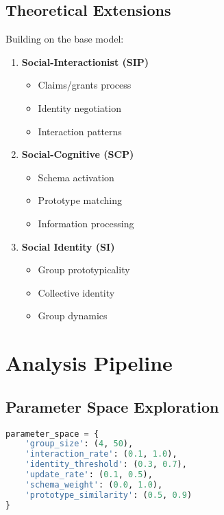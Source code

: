 \documentclass[12pt]{article}
\begin{document}
\subsection{Theoretical Extensions}
Building on the base model:
\begin{enumerate}
    \item \textbf{Social-Interactionist (SIP)}
    \begin{itemize}
        \item Claims/grants process
        \item Identity negotiation
        \item Interaction patterns
    \end{itemize}
    
    \item \textbf{Social-Cognitive (SCP)}
    \begin{itemize}
        \item Schema activation
        \item Prototype matching
        \item Information processing
    \end{itemize}
    
    \item \textbf{Social Identity (SI)}
    \begin{itemize}
        \item Group prototypicality
        \item Collective identity
        \item Group dynamics
    \end{itemize}
\end{enumerate}

\section{Analysis Pipeline}

\subsection{Parameter Space Exploration}
\begin{lstlisting}[language=Python, caption=Parameter Space Definition]
parameter_space = {
    'group_size': (4, 50),
    'interaction_rate': (0.1, 1.0),
    'identity_threshold': (0.3, 0.7),
    'update_rate': (0.1, 0.5),
    'schema_weight': (0.0, 1.0),
    'prototype_similarity': (0.5, 0.9)
}
\end{lstlisting}
\end{document}
